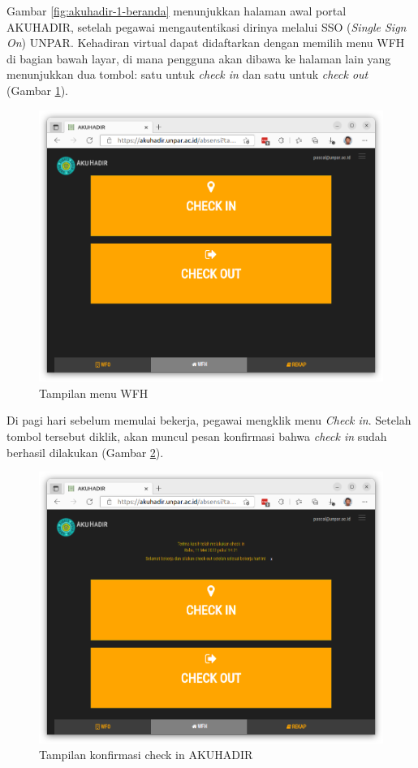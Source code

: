 Gambar \ref{fig:akuhadir-1-beranda} menunjukkan halaman awal portal AKUHADIR, setelah pegawai mengautentikasi dirinya melalui SSO (\textit{Single Sign On}) UNPAR. Kehadiran virtual dapat didaftarkan dengan memilih menu WFH di bagian bawah layar, di mana pengguna akan dibawa ke halaman lain yang menunjukkan dua tombol: satu untuk \textit{check in} dan satu untuk \textit{check out} (Gambar \ref{fig:akuhadir-2-wfh}).

\begin{figure}[H]
	\centering
	\includegraphics[scale=0.3]{Gambar/akuhadir-2-wfh.png}
	\caption{Tampilan menu WFH} 
	\label{fig:akuhadir-2-wfh}
\end{figure}

Di pagi hari sebelum memulai bekerja, pegawai mengklik menu \textit{Check in}. Setelah tombol tersebut diklik, akan muncul pesan konfirmasi bahwa \textit{check in} sudah berhasil dilakukan (Gambar \ref{fig:akuhadir-3-wfh-checkin}).

\begin{figure}[H]
	\centering
	\includegraphics[scale=0.3]{Gambar/akuhadir-3-wfh-checkin.png}
	\caption{Tampilan konfirmasi check in AKUHADIR} 
	\label{fig:akuhadir-3-wfh-checkin}
\end{figure}

